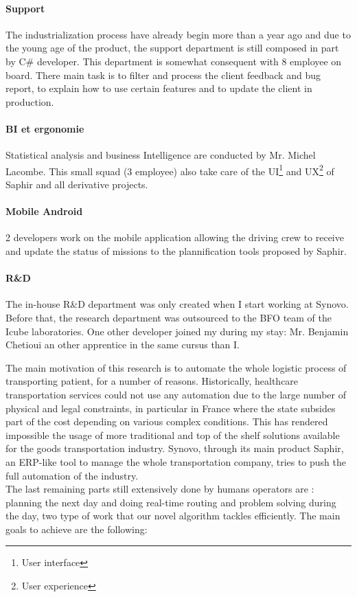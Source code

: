 \documentclass[12pt]{memoir}
\begin{document}
\paragraph{Support}\label{support}

The industrialization process have already begin more than a year ago and due to the young age of the product, the support department is still composed in part by C\# developer. This department is somewhat consequent with 8 employee on board. There main task is to filter and process the client feedback and bug report, to explain how to use certain features and to update the client in production. 


\paragraph{BI et ergonomie}\label{bi-and-UX}

Statistical analysis and business Intelligence are conducted by Mr. Michel Lacombe.
This small squad (3 employee) also take care of the UI\footnote{User interface} and
UX\footnote{User experience} of Saphir and all derivative projects.


\paragraph{Mobile Android}\label{mobile-android}

2 developers work on the mobile application allowing the driving crew to receive and update the status of missions to the plannification tools proposed by Saphir.

\paragraph{R\&D}\label{rd}

The in-house R\&D department was only created when I start working at Synovo.
Before that, the research department was outsourced to the BFO team of the Icube laboratories. 
One other developer joined my during my stay: Mr. Benjamin Chetioui an other apprentice in the same cursus than I.


\label{sub:Synovo}

\label{sec:Context of research}
\bigskip
The main motivation of this research is to automate the whole logistic process of
transporting patient, for a number of reasons. Historically, healthcare transportation
services could not use any automation due to the large number of physical and legal
constraints, in particular in France where the state subsides part of the cost
depending on various complex conditions. This has rendered impossible the usage of
more traditional and top of the shelf solutions available for the goods
transportation industry. Synovo, through its main product Saphir, an ERP-like tool
to manage the whole transportation company, tries to push the full automation of the
industry. \\
The last remaining parts still extensively done by humans operators are : planning the
next day and doing real-time routing and problem solving during the day, two type of
work that our novel algorithm tackles efficiently. The main goals to achieve are the
following:
\end{document}
